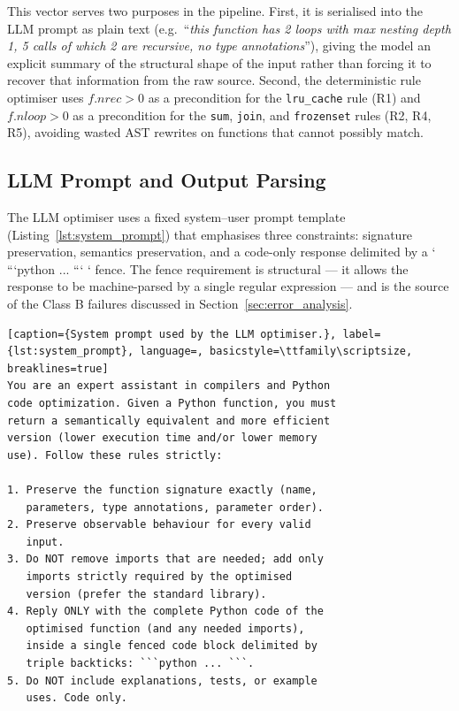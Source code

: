 \documentclass[conference]{IEEEtran}
\begin{document}
This vector serves two purposes in the pipeline. First, it is serialised into the LLM prompt as plain text (e.g.\ ``\textit{this function has 2 loops with max nesting depth 1, 5 calls of which 2 are recursive, no type annotations}''), giving the model an explicit summary of the structural shape of the input rather than forcing it to recover that information from the raw source. Second, the deterministic rule optimiser uses $f.\mathit{nrec} > 0$ as a precondition for the \texttt{lru\_cache} rule (R1) and $f.\mathit{nloop} > 0$ as a precondition for the \texttt{sum}, \texttt{join}, and \texttt{frozenset} rules (R2, R4, R5), avoiding wasted AST rewrites on functions that cannot possibly match.

\subsection{LLM Prompt and Output Parsing}
The LLM optimiser uses a fixed system--user prompt template (Listing~\ref{lst:system_prompt}) that emphasises three constraints: signature preservation, semantics preservation, and a code-only response delimited by a ` ```python ... ``` ` fence. The fence requirement is structural --- it allows the response to be machine-parsed by a single regular expression --- and is the source of the Class B failures discussed in Section~\ref{sec:error_analysis}.

\par\medskip\noindent
\begin{minipage}{\columnwidth}
\begin{lstlisting}[caption={System prompt used by the LLM optimiser.}, label={lst:system_prompt}, language=, basicstyle=\ttfamily\scriptsize, breaklines=true]
You are an expert assistant in compilers and Python
code optimization. Given a Python function, you must
return a semantically equivalent and more efficient
version (lower execution time and/or lower memory
use). Follow these rules strictly:

1. Preserve the function signature exactly (name,
   parameters, type annotations, parameter order).
2. Preserve observable behaviour for every valid
   input.
3. Do NOT remove imports that are needed; add only
   imports strictly required by the optimised
   version (prefer the standard library).
4. Reply ONLY with the complete Python code of the
   optimised function (and any needed imports),
   inside a single fenced code block delimited by
   triple backticks: ```python ... ```.
5. Do NOT include explanations, tests, or example
   uses. Code only.
\end{lstlisting}
\end{minipage}\par\medskip
\end{document}
